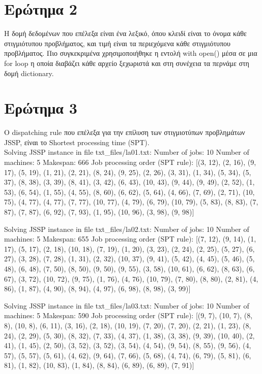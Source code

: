 \documentclass[paper=a4, fontsize=11pt]{scrartcl}
\numberwithin{equation}{section}		%
\numberwithin{figure}{section}			%
\numberwithin{table}{section}				%
\begin{document}
	
\section*{Ερώτημα 2}
Η δομή δεδομένων που επέλεξα είναι ένα λεξικό, όπου κλειδί είναι το όνομα κάθε στιγμιότυπου προβλήματος, και τιμή είναι τα περιεχόμενα κάθε στιγμιότυπου προβλήματος. Πιο συγκεκριμένα χρησιμοποιήθηκε η εντολή with open() μέσα σε μια for loop η οποία διαβάζει κάθε αρχείο ξεχωριστά και στη συνέχεια τα περνάμε στη δομή dictionary. 
    
    
\section*{Ερώτημα 3}
Ο dispatching rule που επέλεξα για την επίλυση των στιγμιοτύπων προβλημάτων JSSP, είναι το Shortest processing time (SPT). \\

Solving JSSP instance in file txt\_files/la01.txt:
Number of jobs: 10
Number of machines: 5
Makespan: 666
Job processing order (SPT rule): [(3, 12), (2, 16), (9, 17), (5, 19), (1, 21), (2, 21), (8, 24), (9, 25), (2, 26), (3, 31), (1, 34), (5, 34), (5, 37), (8, 38), (3, 39), (8, 41), (3, 42), (6, 43), (10, 43), (9, 44), (9, 49), (2, 52), (1, 53), (6, 54), (1, 55), (4, 55), (8, 60), (6, 62), (5, 64), (4, 66), (7, 69), (2, 71), (10, 75), (4, 77), (4, 77), (7, 77), (10, 77), (4, 79), (6, 79), (10, 79), (5, 83), (8, 83), (7, 87), (7, 87), (6, 92), (7, 93), (1, 95), (10, 96), (3, 98), (9, 98)]

Solving JSSP instance in file txt\_files/la02.txt:
Number of jobs: 10
Number of machines: 5
Makespan: 655
Job processing order (SPT rule): [(7, 12), (9, 14), (1, 17), (5, 17), (2, 18), (10, 18), (7, 19), (1, 20), (3, 23), (2, 24), (2, 25), (5, 27), (6, 27), (3, 28), (7, 28), (1, 31), (2, 32), (10, 37), (9, 41), (5, 42), (4, 45), (5, 46), (5, 48), (6, 48), (7, 50), (8, 50), (9, 50), (9, 55), (3, 58), (10, 61), (6, 62), (8, 63), (6, 67), (3, 72), (10, 72), (9, 75), (1, 76), (4, 76), (10, 79), (7, 80), (8, 80), (2, 81), (4, 86), (1, 87), (4, 90), (8, 94), (4, 97), (6, 98), (8, 98), (3, 99)]

Solving JSSP instance in file txt\_files/la03.txt:
Number of jobs: 10
Number of machines: 5
Makespan: 590
Job processing order (SPT rule): [(9, 7), (10, 7), (8, 8), (10, 8), (6, 11), (3, 16), (2, 18), (10, 19), (7, 20), (7, 20), (2, 21), (1, 23), (8, 24), (2, 29), (5, 30), (8, 32), (7, 33), (4, 37), (1, 38), (3, 38), (9, 39), (10, 40), (2, 41), (1, 45), (2, 50), (3, 52), (3, 52), (3, 54), (4, 54), (9, 54), (8, 55), (9, 56), (4, 57), (5, 57), (5, 61), (4, 62), (9, 64), (7, 66), (5, 68), (4, 74), (6, 79), (5, 81), (6, 81), (1, 82), (10, 83), (1, 84), (8, 84), (6, 89), (6, 89), (7, 91)]
\end{document}
